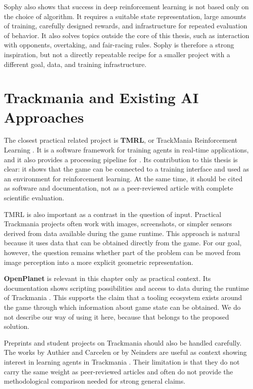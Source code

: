 Sophy also shows that success in deep reinforcement learning is not based only on the choice of algorithm. It requires a suitable state representation, large amounts of training, carefully designed rewards, and infrastructure for repeated evaluation of behavior. It also solves topics outside the core of this thesis, such as interaction with opponents, overtaking, and fair-racing rules. Sophy is therefore a strong inspiration, but not a directly repeatable recipe for a smaller project with a different goal, data, and training infrastructure.

\section{Trackmania and Existing AI Approaches}

The closest practical related project is \textbf{TMRL}, or TrackMania Reinforcement Learning \cite{tmrl_github2024}. It is a software framework for training agents in real-time applications, and it also provides a processing pipeline for \Trackmania{}. Its contribution to this thesis is clear: it shows that the game can be connected to a training interface and used as an environment for reinforcement learning. At the same time, it should be cited as software and documentation, not as a peer-reviewed article with complete scientific evaluation.

TMRL is also important as a contrast in the question of input. Practical Trackmania projects often work with images, screenshots, or simpler sensors derived from data available during the game runtime. This approach is natural because it uses data that can be obtained directly from the game. For our goal, however, the question remains whether part of the problem can be moved from image perception into a more explicit geometric representation.

\textbf{OpenPlanet} is relevant in this chapter only as practical context. Its documentation shows scripting possibilities and access to data during the runtime of Trackmania \cite{openplanet_wiki2026}. This supports the claim that a tooling ecosystem exists around the game through which information about game state can be obtained. We do not describe our way of using it here, because that belongs to the proposed solution.

Preprints and student projects on Trackmania should also be handled carefully. The works by Authier and Carcelen or by Neinders are useful as context showing interest in learning agents in Trackmania \cite{trackmania_drl_preprint2024, neinders_trackmania_sophy2023}. Their limitation is that they do not carry the same weight as peer-reviewed articles and often do not provide the methodological comparison needed for strong general claims.

